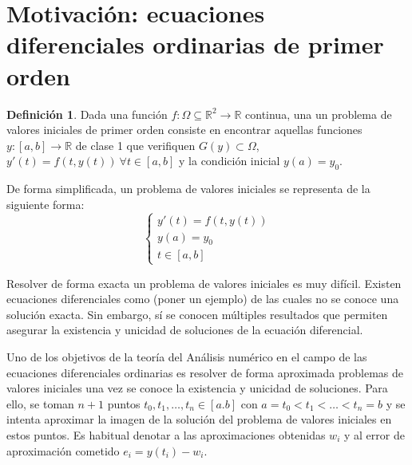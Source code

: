 \documentclass{article}
\theoremstyle{theorem-style}  %
\theoremstyle{definition}
\newtheorem{definition}{Definición}[section]
\theoremstyle{example-style}
\begin{document}
\maketitle



\newpage
\tableofcontents
\newpage


\section{Motivación: ecuaciones diferenciales ordinarias de primer orden} \label{sec:motivacion}

	\begin{definition} 
		Dada una función $f:\Omega \subseteq \mathbb R^2  \to \mathbb{R}$ continua, una un problema de valores iniciales de primer orden consiste en encontrar aquellas funciones $y: [a,b] \rightarrow \mathbb{R}$ de clase 1 que verifiquen $G(y) \subset \Omega$, $y'(t) = f(t,y(t)) \ \forall t \in [a,b]$ y la condición inicial $y(a) = y_0$.  
	\end{definition}

	De forma simplificada, un problema de valores iniciales se representa de la siguiente forma: 
	\begin{equation*}
		\begin{cases}
			y'(t) = f(t,y(t)) \\
			y(a) = y_0 \\
			t \in [a,b]
		\end{cases}
	\end{equation*}

	Resolver de forma exacta un problema de valores iniciales es muy difícil. Existen ecuaciones diferenciales como (poner un ejemplo) de las cuales no se conoce una solución exacta. Sin embargo, sí se conocen múltiples resultados que permiten asegurar la existencia y unicidad de soluciones de la ecuación diferencial.


	Uno de los objetivos de la teoría del Análisis numérico en el campo de las ecuaciones diferenciales ordinarias es resolver de forma aproximada problemas de valores iniciales una vez se conoce la existencia y unicidad de soluciones. Para ello, se toman $n+1$ puntos $t_0, t_1, \ldots, t_n \in [a.b]$ con $a = t_0 < t_1 < \ldots < t_n = b$ y se intenta aproximar la imagen de la solución del problema de valores iniciales en estos puntos. Es habitual denotar a las aproximaciones obtenidas $w_i$ y al error de aproximación cometido $e_i = y(t_i) - w_i$.
\end{document}
